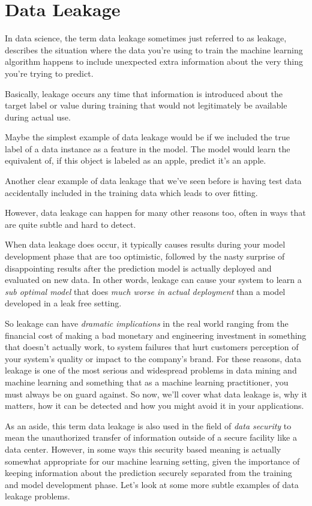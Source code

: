 \section{Data Leakage}
\begin{multicols}{2}

In data science, the term data leakage sometimes just referred to as leakage, describes the situation where the data you're using to train the machine learning algorithm happens to include unexpected extra information about the very thing you're trying to predict. 

Basically, leakage occurs any time that information is introduced about the target label or value during training that would not legitimately be available during actual use. 

Maybe the simplest example of data leakage would be if we included the true label of a data instance as a feature in the model. The model would learn the equivalent of, if this object is labeled as an apple, predict it's an apple. 

Another clear example of data leakage that we've seen before is having test data accidentally included in the training data which leads to over fitting. 

However, data leakage can happen for many other reasons too, often in ways that are quite subtle and hard to detect. 

When data leakage does occur, it typically causes results during your model development phase that are too optimistic, followed by the nasty surprise of disappointing results after the prediction model is actually deployed and evaluated on new data. In other words, leakage can cause your system to learn a \emph{sub optimal model} that does \emph{much worse in actual deployment} than a model developed in a leak free setting. 

So leakage can have \emph{dramatic implications} in the real world ranging from the financial cost of making a bad monetary and engineering investment in something that doesn't actually work, to system failures that hurt customers perception of your system's quality or impact to the company's brand. For these reasons, data leakage is one of the most serious and widespread problems in data mining and machine learning and something that as a machine learning practitioner, you must always be on guard against. So now, we'll cover what data leakage is, why it matters, how it can be detected and how you might avoid it in your applications. 

As an aside, this term data leakage is also used in the field of \emph{data security} to mean the unauthorized transfer of information outside of a secure facility like a data center. However, in some ways this security based meaning is actually somewhat appropriate for our machine learning setting, given the importance of keeping information about the prediction securely separated from the training and model development phase. Let's look at some more subtle examples of data leakage problems. 


\end{multicols}
